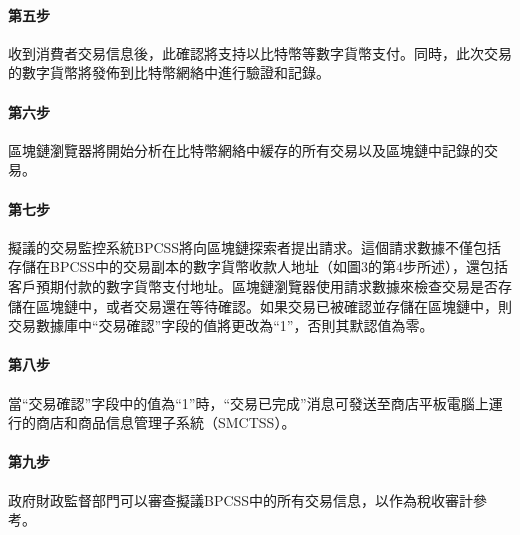 		\paragraph{第五步}收到消費者交易信息後，此確認將支持以比特幣等數字貨幣支付。同時，此次交易的數字貨幣將發佈到比特幣網絡中進行驗證和記錄。
		\paragraph{第六步}區塊鏈瀏覽器將開始分析在比特幣網絡中緩存的所有交易以及區塊鏈中記錄的交易。
		\paragraph{第七步}擬議的交易監控系統BPCSS將向區塊鏈探索者提出請求。這個請求數據不僅包括存儲在BPCSS中的交易副本的數字貨幣收款人地址（如圖3的第4步所述），還包括客戶預期付款的數字貨幣支付地址。區塊鏈瀏覽器使用請求數據來檢查交易是否存儲在區塊鏈中，或者交易還在等待確認。如果交易已被確認並存儲在區塊鏈中，則交易數據庫中“交易確認”字段的值將更改為“1”，否則其默認值為零。
		\paragraph{第八步}當“交易確認”字段中的值為“1”時，“交易已完成”消息可發送至商店平板電腦上運行的商店和商品信息管理子系統（SMCTSS）。
		\paragraph{第九步}政府財政監督部門可以審查擬議BPCSS中的所有交易信息，以作為稅收審計參考。

	
